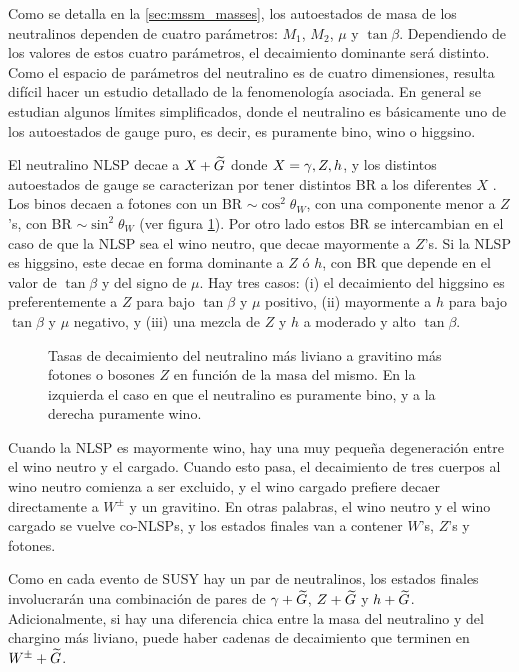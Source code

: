 Como se detalla en la \cref{sec:mssm_masses}, los autoestados de masa de los
neutralinos dependen de cuatro parámetros: $M_1$, $M_2$, $\mu$ y $\tan\beta$.
Dependiendo de los valores de estos cuatro parámetros, el decaimiento dominante
será distinto. Como el espacio de parámetros del neutralino es de cuatro
dimensiones, resulta difícil hacer un estudio detallado de la fenomenología asociada.
En general se estudian algunos límites simplificados, donde el neutralino
es básicamente uno de los autoestados de gauge puro, es decir, es puramente
bino, wino o higgsino. %

El neutralino NLSP decae a $X + \widetilde{G}$ donde $X=\gamma,Z,h$, y los distintos
autoestados de gauge se caracterizan por tener distintos BR a los diferentes $X$
\cite{Ruderman:2011vv}.
Los binos decaen a fotones con un BR $\sim \cos^2\theta_W$, con una componente
menor a $Z$'s, con BR $\sim \sin^2\theta_W$ (ver figura
\cref{fig:bino_wino_br}). Por otro lado estos BR se intercambian en el caso de
que la NLSP sea el wino neutro, que decae mayormente a $Z$'s. Si la NLSP es
higgsino, este decae en forma dominante a $Z$ ó $h$, con BR que depende en el
valor de $\tan\beta$ y del signo de $\mu$. Hay tres casos: (i) el decaimiento
del higgsino es preferentemente a $Z$ para bajo $\tan\beta$ y $\mu$ positivo,
(ii) mayormente a $h$ para bajo $\tan\beta$ y $\mu$ negativo, y (iii) una mezcla
de $Z$ y $h$ a moderado y alto $\tan\beta$.

\begin{figure}[!h]
  \centering

  
  

  \caption{Tasas de decaimiento del neutralino más liviano a gravitino más
    fotones o bosones $Z$ en función de la masa del mismo. En la izquierda el
    caso en que el neutralino es puramente bino, y a la derecha puramente wino.}
  \label{fig:bino_wino_br}
\end{figure}

Cuando la NLSP es mayormente wino, hay una muy pequeña degeneración entre el
wino neutro y el cargado. Cuando esto pasa, el decaimiento de tres cuerpos al
wino neutro comienza a ser excluido, y el wino cargado prefiere decaer
directamente a $W^{\pm}$ y un gravitino. En otras palabras, el wino neutro y el
wino cargado se vuelve co-NLSPs, y los estados finales van a contener $W$'s,
$Z$'s y fotones.

Como en cada evento de SUSY hay un par de neutralinos, los estados finales
involucrarán una combinación de pares de $\gamma + \widetilde{G}$, $Z + \widetilde{G}$ y $h
+ \widetilde{G}$. Adicionalmente, si hay una diferencia chica entre la masa del
neutralino y del chargino más liviano, puede haber cadenas de decaimiento que
terminen en $W^\pm + \widetilde{G}$.

